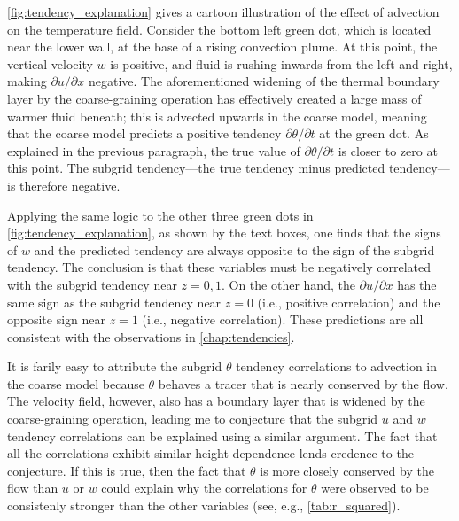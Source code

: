 \documentclass[../main.tex]{subfiles}
\begin{document}
\cref{fig:tendency_explanation} gives a cartoon illustration of the effect of
advection on the temperature field. Consider the bottom left green dot,
which is located near the lower wall, at the base of a rising convection
plume. At this point, the vertical velocity $w$ is positive, and fluid is
rushing inwards from the left and right, making $\partial u/\partial x$
negative. The aforementioned widening of the thermal boundary layer by
the coarse-graining operation has effectively created a large mass of warmer
fluid beneath; this is advected upwards in the coarse model, meaning that
the coarse model predicts a positive tendency $\partial\theta/\partial t$
at the green dot. As explained in the previous paragraph, the true value of
$\partial\theta/\partial t$ is closer  to zero at this point. The subgrid
tendency---the true tendency minus predicted tendency---is therefore negative.

Applying the same logic to the other three green dots in
\cref{fig:tendency_explanation}, as shown by the text boxes, one finds that the
signs of $w$ and the predicted tendency are always opposite to the sign of the
subgrid tendency. The conclusion is that these variables must be negatively
correlated with the subgrid tendency near $z=0,1$. On the other hand, the
$\partial u/\partial x$ has the same sign as the subgrid tendency near $z=0$
(i.e., positive correlation) and the opposite sign near $z=1$ (i.e., negative
correlation). These predictions are all consistent with the observations in
\cref{chap:tendencies}.

It is farily easy to attribute the subgrid $\theta$ tendency correlations to
advection in the coarse model because $\theta$ behaves a tracer that is nearly
conserved by the flow. The velocity field, however, also has a boundary layer
that is widened by the coarse-graining operation, leading me to conjecture that
the subgrid $u$ and $w$ tendency correlations can be explained using a similar
argument. The fact that all the correlations exhibit similar height dependence
lends credence to the conjecture. If this is true, then the fact that $\theta$
is more closely conserved by the flow than $u$ or $w$ could explain why the
correlations for $\theta$ were observed to be consistenly stronger than the
other variables (see, e.g., \cref{tab:r_squared}).
\end{document}
